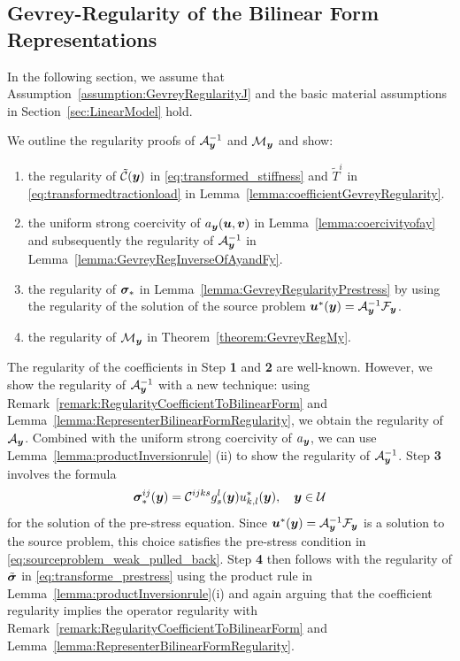 \subsection{Gevrey-Regularity of the Bilinear Form Representations} \label{subsec:RegularityA_yM_y} 
In the following section, we assume that Assumption~\ref{assumption:GevreyRegularityJ} and the basic material assumptions in Section~\ref{sec:LinearModel} hold.

We outline the regularity proofs of $\mathcal{A}^{-1}_{{\boldsymbol{y}}}$ and $\mathcal{M}_{\boldsymbol{y}}$ and show:
\begin{enumerate}
    \item[\textbf{1.}] the regularity of $\tilde {\mathcal{C}}({\boldsymbol{y}})$ in \eqref{eq:transformed_stiffness} and $\tilde T^i$ in \eqref{eq:transformedtractionload} in Lemma~\ref{lemma:coefficientGevreyRegularity}.
    \item[\textbf{2.}]  the uniform strong coercivity of $a_{{\boldsymbol{y}}}({\boldsymbol{u}},{\boldsymbol{v}})$ in Lemma~\ref{lemma:coercivityofay} and subsequently the regularity of $\mathcal{A}^{-1}_{\boldsymbol{y}}$ in Lemma~\ref{lemma:GevreyRegInverseOfAyandFy}.
    \item[\textbf{3.}]  the regularity of $\boldsymbol{\sigma}_*$ in Lemma~\ref{lemma:GevreyRegularityPrestress} by using the regularity of
    the solution of the source problem ${\boldsymbol{u}}^*({\boldsymbol{y}}) = \mathcal{A}_{\boldsymbol{y}}^{-1}\mathcal{F}_{\boldsymbol{y}}$.
    \item[\textbf{4.}] the regularity of $\mathcal{M}_{{\boldsymbol{y}}}$ in Theorem~\ref{theorem:GevreyRegMy}.
\end{enumerate}
The regularity of the coefficients in Step \textbf{1} and \textbf{2} are well-known. However, we show the regularity of $\mathcal{A}_{{\boldsymbol{y}}}^{-1}$ with a new technique: using Remark~\ref{remark:RegularityCoefficientToBilinearForm} and Lemma~\ref{lemma:RepresenterBilinearFormRegularity}, we obtain the regularity of $\mathcal{A}_{\boldsymbol{y}}$. Combined with the uniform strong coercivity of $a_{{\boldsymbol{y}}}$, we can use Lemma~\ref{lemma:productInversionrule} (ii) to show the regularity of $\mathcal{A}_{{\boldsymbol{y}}}^{-1}$.
Step \textbf{3} involves the formula
\begin{align}\label{eq:prestressId2}
    \boldsymbol{\sigma}_*^{ij}({\boldsymbol{y}}) = \mathcal{C}^{ijks}g_s^l({\boldsymbol{y}}) u^*_{k,l}({\boldsymbol{y}}), \quad {\boldsymbol{y}} \in \mathcal{U}
\end{align}
for the solution of the pre-stress equation. %
Since ${\boldsymbol{u}}^*({\boldsymbol{y}}) = \mathcal{A}_{\boldsymbol{y}}^{-1} \mathcal{F}_{{\boldsymbol{y}}}$ is a solution to the source problem, this choice satisfies the pre-stress condition in \eqref{eq:sourceproblem_weak_pulled_back}.
Step \textbf{4} then follows with the regularity of $\tilde{\boldsymbol{\sigma}}$ in \eqref{eq:transforme_prestress} using the product rule in Lemma~\ref{lemma:productInversionrule}(i) and again arguing that the coefficient regularity implies the operator regularity with Remark~\ref{remark:RegularityCoefficientToBilinearForm} and Lemma~\ref{lemma:RepresenterBilinearFormRegularity}.

